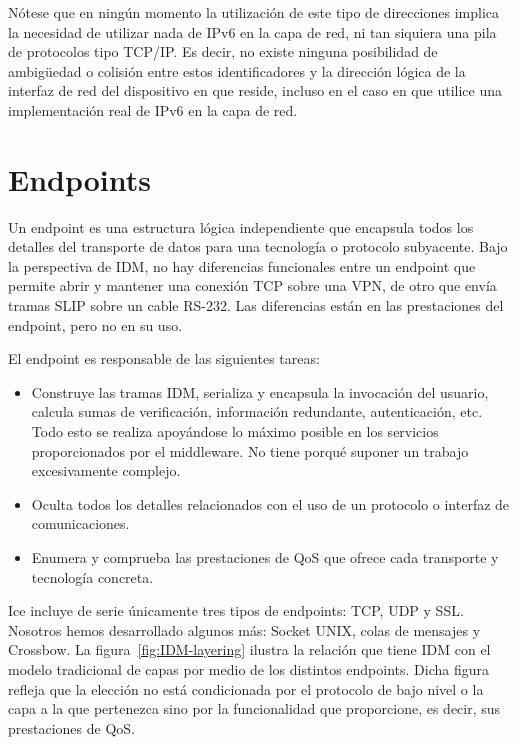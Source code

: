 \documentclass{arco-article}
\def \mw {middleware}
\begin{document}
Nótese que en ningún momento la utilización de este tipo de
direcciones implica la necesidad de utilizar nada de \ac{IPv6} en la
capa de red, ni tan siquiera una pila de protocolos tipo \ac{TCP/IP}.
Es decir, no existe ninguna posibilidad de ambigüedad o colisión entre
estos identificadores y la dirección lógica de la interfaz de red del
dispositivo en que reside, incluso en el caso en que utilice una
implementación real de \ac{IPv6} en la capa de red.


\section{Endpoints}

Un endpoint es una estructura lógica independiente que encapsula
todos los detalles del transporte de datos para una tecnología o
protocolo subyacente.  Bajo la perspectiva de \ac{IDM}, no hay
diferencias funcionales entre un endpoint que permite abrir y mantener
una conexión \ac{TCP} sobre una \ac{VPN}, de otro que envía tramas
\ac{SLIP} sobre un cable RS-232. Las diferencias están en las
prestaciones del endpoint, pero no en su uso.

El endpoint es responsable de las siguientes tareas:

\begin{itemize}
\item Construye las tramas \ac{IDM}, serializa y encapsula la
  invocación del usuario, calcula sumas de verificación, información
  redundante, autenticación, etc. Todo esto se realiza apoyándose lo
  máximo posible en los servicios proporcionados por el \mw. No tiene
  porqué suponer un trabajo excesivamente complejo.

\item Oculta todos los detalles relacionados con el uso de un
  protocolo o interfaz de comunicaciones.

\item Enumera y comprueba las prestaciones de \ac{QoS} que ofrece cada
  transporte y tecnología concreta.
\end{itemize}

\ac{Ice} incluye de serie únicamente tres tipos de endpoints:
\ac{TCP}, \ac{UDP} y \ac{SSL}.  Nosotros hemos desarrollado algunos
más: Socket UNIX, colas de mensajes y Crossbow.  La
figura~\ref{fig:IDM-layering} ilustra la relación que tiene \ac{IDM}
con el modelo tradicional de capas por medio de los distintos
endpoints. Dicha figura refleja que la elección no está condicionada por
el protocolo de bajo nivel o la capa a la que pertenezca sino por la
funcionalidad que proporcione, es decir, sus prestaciones de \ac{QoS}.
\end{document}
